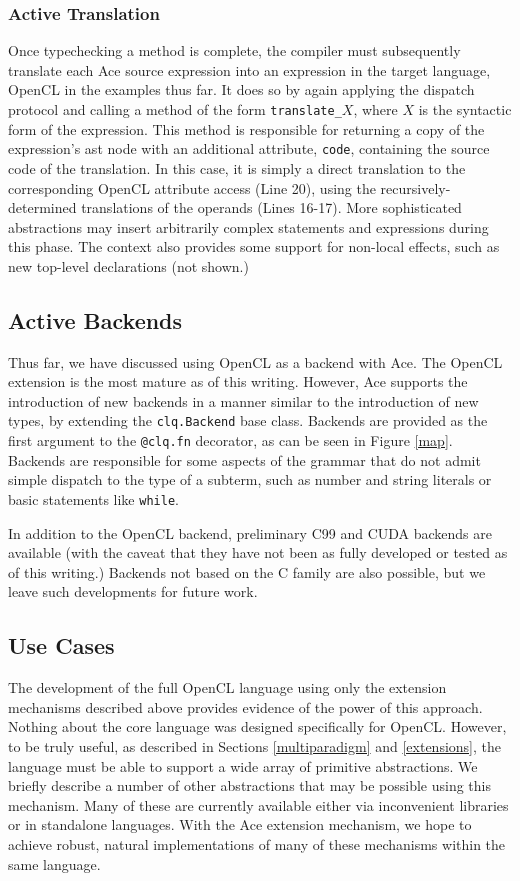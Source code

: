\documentclass{sig-alternate}
\begin{document}
\subsubsection{Active Translation}
Once typechecking a method is complete, the compiler must subsequently translate each Ace source expression into an expression in the target language, OpenCL in the examples thus far. It does so by again applying the dispatch protocol and calling a method of the form \verb|translate_|$X$, where $X$ is the syntactic form of the expression. This method is responsible for returning a copy of the expression's ast node with an additional attribute, \verb|code|, containing the source code of the translation. In this case, it is simply a direct translation to the corresponding OpenCL attribute access (Line 20), using the recursively-determined translations of the operands (Lines 16-17).  More sophisticated abstractions may insert arbitrarily complex statements and expressions during this phase. The context also provides some support for non-local effects, such as new top-level declarations (not shown.)

\subsection{Active Backends}\label{backends}
Thus far, we have discussed using OpenCL as a backend with Ace. The OpenCL extension is the most mature as of this writing. However, Ace supports the introduction of new backends in a manner similar to the introduction of new types, by extending the \verb|clq.Backend| base class. Backends are provided as the first argument to the \verb|@clq.fn| decorator, as can be seen in Figure \ref{map}. 
Backends are responsible for some aspects of the grammar that do not admit simple dispatch to the type of a subterm, such as number and string literals or basic statements like \verb|while|.

In addition to the OpenCL backend, preliminary C99 and CUDA backends are available (with the caveat that they have not been as fully developed or tested as of this writing.) Backends not based on the C family are also possible, but we leave such developments for future work.

\subsection{Use Cases}
The development of the full OpenCL language using only the extension mechanisms described above provides evidence of the power of this approach. Nothing about the core language was designed specifically for OpenCL. However, to be truly useful, as described in Sections \ref{multiparadigm} and  \ref{extensions}, the language must be able to support a wide array of primitive abstractions. We briefly describe a number of other abstractions that may be possible using this mechanism. Many of these are currently available either via inconvenient libraries or in standalone languages. With the Ace extension mechanism, we hope to achieve robust, natural implementations of many of these mechanisms within the same language.
\end{document}
